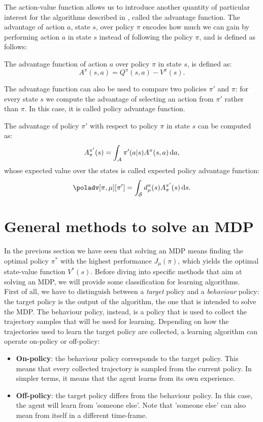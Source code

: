 The action-value function allows us to introduce another quantity of particular interest for the algorithms described in , called the advantage function. The advantage of action $a$, state $s$, over policy $\pi$ encodes how much we can gain by performing action $a$ in state $s$ instead of following the policy $\pi$, and is defined as follows:
\begin{definition}
The advantage function of action $a$ over policy $\pi$ in state $s$, is defined as:
\[
A^{\pi}(s,a) = Q^{\pi}(s,a) - V^{\pi}(s).
\]
\end{definition}

The advantage function can also be used to compare two policies $\pi'$ and $\pi$: for every state $s$ we compute the advantage of selecting an action from $\pi'$ rather than $\pi$. In this case, it is called policy advantage function.
\begin{definition}
The advantage of policy $\pi'$ with respect to policy $\pi$ in state $s$ can be computed as:
\[
A_\pi^{\pi'}(s) = \int_{\mathcal{A}} \pi'(a|s)A^\pi(s, a) \, \textrm{d} a,
\]
whose expected value over the states is called expected policy advantage function:
\[
\poladv[\pi,\mu][\pi'] = \int_{\sspace} d_\mu^{\pi}(s)A_\pi^{\pi'}(s) \de s.
\]
\end{definition}


\section{General methods to solve an MDP}
\label{sec:solve-mdp}

In the previous section we have seen that solving an MDP means finding the optimal policy $\pi^*$ with the highest performance $J_\mu(\pi)$, which yields the optimal state-value function $V^*(s)$. Before diving into specific methods that aim at solving an MDP, we will provide some classification for learning algorithms.\\
First of all, we have to distinguish between a \textit{target} policy and a \textit{behaviour} policy: the target policy is the output of the algorithm, the one that is intended to solve the MDP. The behaviour policy, instead, is a policy that is used to collect the trajectory samples that will be used for learning. Depending on how the trajectories used to learn the target policy are collected, a learning algorithm can operate on-policy or off-policy:
\begin{itemize}
\item \textbf{On-policy}: the behaviour policy corresponds to the target policy. This means that every collected trajectory is sampled from the current policy. In simpler terms, it means that the agent learns from its own experience.
\item \textbf{Off-policy}: the target policy differs from the behaviour policy. In this case, the agent will learn from 'someone else'. Note that 'someone else' can also mean from itself in a different time-frame.
\end{itemize}

